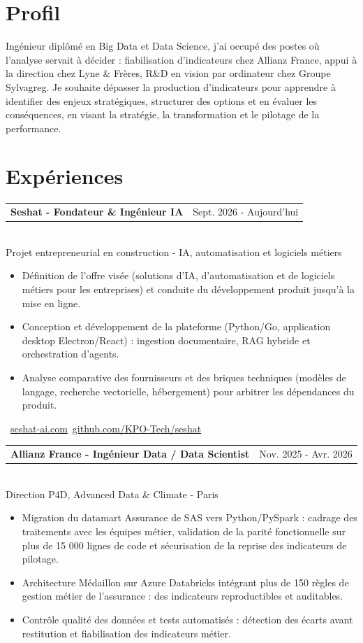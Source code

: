 \documentclass[10pt,a4paper]{article}
\makeatletter
\newcommand{\role}[3]{%
  \vspace{2pt}
  \begin{tabularx}{\linewidth}{@{}Xr@{}}
  \textbf{#1} & {\color{muted}#2}
  \end{tabularx}\vspace{0.8pt}\\
  {\color{muted}#3}\par
  \vspace{2pt}
}
\makeatother
\begin{document}
\begin{lrbox}{\maincolumnbox}
\begin{minipage}[t]{0.695\textwidth}
\vspace{0pt}
\raggedright

\section{Profil}
Ingénieur diplômé en Big Data et Data Science, j'ai occupé des postes où l'analyse servait à décider : fiabilisation d'indicateurs chez Allianz France, appui à la direction chez Lyne \& Frères, R\&D en vision par ordinateur chez Groupe Sylvagreg. Je souhaite dépasser la production d'indicateurs pour apprendre à identifier des enjeux stratégiques, structurer des options et en évaluer les conséquences, en visant la stratégie, la transformation et le pilotage de la performance.

\section{Expériences}
\role{Seshat - Fondateur \& Ingénieur IA}{Sept. 2026 - Aujourd'hui}{Projet entrepreneurial en construction - IA, automatisation et logiciels métiers}
\begin{itemize}
  \item Définition de l'offre visée (solutions d'IA, d'automatisation et de logiciels métiers pour les entreprises) et conduite du développement produit jusqu'à la mise en ligne.
  \item Conception et développement de la plateforme (Python/Go, application desktop Electron/React) : ingestion documentaire, RAG hybride et orchestration d'agents.
  \item Analyse comparative des fournisseurs et des briques techniques (modèles de langage, recherche vectorielle, hébergement) pour arbitrer les dépendances du produit.
\end{itemize}
{\footnotesize\color{accent}\ \href{https://seshat-ai.com}{seshat-ai.com}\enspace\textbullet\enspace{}\ \href{https://github.com/KPO-Tech/seshat}{github.com/KPO-Tech/seshat}}\par

\vspace{4pt}
\role{Allianz France - Ingénieur Data / Data Scientist}{Nov. 2025 - Avr. 2026}{Direction P4D, Advanced Data \& Climate - Paris}
\begin{itemize}
  \item Migration du datamart Assurance de SAS vers Python/PySpark : cadrage des traitements avec les équipes métier, validation de la parité fonctionnelle sur plus de 15 000 lignes de code et sécurisation de la reprise des indicateurs de pilotage.
  \item Architecture Médaillon sur Azure Databricks intégrant plus de 150 règles de gestion métier de l'assurance : des indicateurs reproductibles et auditables.
  \item Contrôle qualité des données et tests automatisés : détection des écarts avant restitution et fiabilisation des indicateurs métier.
\end{itemize}


\end{minipage}
\end{lrbox}
\end{document}
